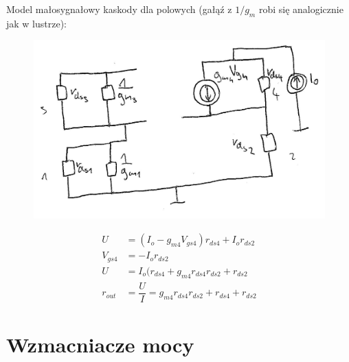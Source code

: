 \documentclass[10pt,a4paper]{article}
\begin{document}
Model małosygnałowy kaskody dla polowych (gałąź z $1/g_{m}$ robi się analogicznie jak w lustrze):
\begin{figure}[H]
\centering
\includegraphics[scale=0.8]{kaskoda_wypr}
\end{figure}
\begin{align*}
U&=(I_o-g_{m4}V_{gs4})r_{ds4}+I_o r_{ds2} \\
V_{gs4}&=-I_o r_{ds2} \\
U&=I_o(r_{ds4}+g_{m4}r_{ds4}r_{ds2}+r_{ds2} \\
r_{out}&=\dfrac{U}{I}=g_{m4}r_{ds4}r_{ds2}+r_{ds4}+r_{ds2}
\end{align*}


\section{Wzmacniacze mocy}
\end{document}
